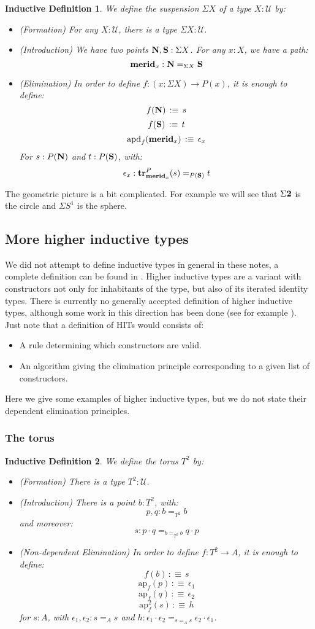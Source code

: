 \documentclass{article}
\newcommand{\sse}[1]{\medbreak \subsection{#1}}
\newcommand{\ssse}[1]{\subsubsection*{#1}}
\newcommand{\U}{{\mathcal U}}
\renewcommand{\r}{\rightarrow}
\newcommand{\ap}{\mathrm{ap}}
\newcommand{\apd}{\mathrm{apd}}
\newcommand{\tr}{\mathrm{\bf tr}}
\newcommand{\N}{\mathrm{\bf N}}
\renewcommand{\S}{\mathrm{\bf S}}
\newcommand{\merid}{\mathrm{\bf merid}}
\newcommand{\two}{{\bf 2}}
\newtheorem{ind_def}{Inductive Definition}
\begin{document}
\begin{ind_def}
We define the suspension $\Sigma X$ of a type $X:\U$ by:
\begin{itemize}
\item (Formation) For any $X:\U$, there is a type $\Sigma X : \U$.
\item (Introduction) We have two points $\N,\S : \Sigma X$. For any $x:X$, we have a path:
\[\merid_x : \N=_{\Sigma X}\S\]
\item (Elimination) In order to define $f:(x:\Sigma X)\r P(x)$, it is enough to define:
\[f(\N) \, :\equiv\, s\]
\[f(\S)\, :\equiv\, t\]
\[\apd_f(\merid_x) \, :\equiv\, \epsilon_x\]
For $s:P(\N)$ and $t:P(\S)$, with:
\[\epsilon_x : \tr^P_{\merid_x}(s) =_{P(\S)} t\] 
\end{itemize}
\end{ind_def}

The geometric picture is a bit complicated. For example we will see that $\Sigma \two$ is the circle and $\Sigma S^1$ is the sphere.



\sse{More higher inductive types}

We did not attempt to define inductive types in general in these notes, a complete definition can be found in \cite{dybjer1994inductive}. Higher inductive types are a variant with constructors not only for inhabitants of the type, but also of its iterated identity types. There is currently no generally accepted definition of higher inductive types, although some work in this direction has been done (see for example \cite{cavallo2019higher}). Just note that a definition of HITs would consists of:
\begin{itemize}
\item A rule determining which constructors are valid.
\item An algorithm giving the elimination principle corresponding to a given list of constructors.
\end{itemize}
Here we give some examples of higher inductive types, but we do not state their dependent elimination principles.


\ssse{The torus}

\begin{ind_def}
We define the torus $T^2$ by:
\begin{itemize}
\item (Formation) There is a type $T^2:\U$.
\item (Introduction) There is a point $b:T^2$, with:
\[p,q:b=_{T^2}b\] 
and moreover: 
\[s:p\cdot q =_{b=_{T^2}b} q\cdot p\]
\item (Non-dependent Elimination) In order to define $f:T^2\r A$, it is enough to define:
\[f(b) \, :\equiv\, s\]
\[\ap_f(p) \, :\equiv\, \epsilon_1 \]
\[\ap_f(q) \, :\equiv\, \epsilon_2\]
\[\ap^2_f(s) \, :\equiv\, h\]
for $s:A$, with $\epsilon_1,\epsilon_2 : s=_As$ and $h:\epsilon_1\cdot\epsilon_2 =_{s=_As}\epsilon_2\cdot\epsilon_1$.
\end{itemize}
\end{ind_def}
\end{document}
